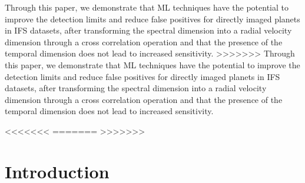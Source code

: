 \documentclass{aa}
\newcommand{\newchange}[1]{\textcolor{darkgreen}{#1}}
\begin{document}
  {Through this paper, we demonstrate that ML techniques have the potential to improve the detection limits and reduce false positives for directly imaged planets in IFS datasets, after transforming the spectral dimension into a radial velocity dimension through a cross correlation operation and that the presence of the temporal dimension does not lead to increased sensitivity.
>>>>>>>
  {Through this paper, we demonstrate that ML techniques have the potential to improve the detection limits and reduce false positives for directly imaged planets in IFS datasets, after transforming the spectral dimension into a radial velocity dimension through a cross correlation operation and that the presence of the temporal dimension does not lead to increased sensitivity.
  }
   

<<<<<<<
=======
>>>>>>>
\maketitle
%

\section{Introduction}

}
\end{document}
